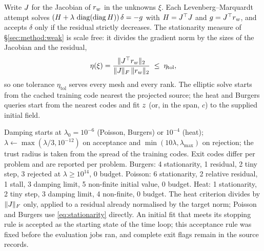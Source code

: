 Write $J_{}$ for the Jacobian of $r_{w}$ in the unknowns $\xi$. Each
Levenberg--Marquardt attempt solves
$(H+\lambda\,\operatorname{diag}(\operatorname{diag} H))\,\delta=-g$ with $H=J_{}^{\top}J_{}$ and
$g=J_{}^{\top}r_{w}$, and accepts $\delta$ only if the residual strictly
decreases. The stationarity measure of \S\ref{sec:method:weak} is scale free: it
divides the gradient norm by the sizes of the Jacobian and the residual,
\begin{equation}
  \eta(\xi)=\frac{\lVert J_{}^{\top}r_{w} \rVert_2}{\lVert J_{} \rVert_{F}\,\lVert r_{w} \rVert_2}
  \;\le\;\eta_{\mathrm{tol}} ,
  \label{eq:stationarity}
\end{equation}
so one tolerance $\eta_{\mathrm{tol}}$ serves every mesh and every rank.
The elliptic solve starts from the cached training code nearest the
projected source; the heat and Burgers queries start from the nearest
codes and fit $z$ (or, in the span, $c$) to the supplied initial
field.

Damping starts at $\lambda_0=10^{-6}$ (Poisson, Burgers) or $10^{-4}$ (heat);
$\lambda\leftarrow\max(\lambda/3,10^{-12})$ on acceptance and
$\min(10\lambda,\lambda_{\max})$ on rejection; the trust radius is taken from the
spread of the training codes. Exit codes differ per problem and are reported per
problem. Burgers: 4 stationarity, 1 residual, 2 tiny step, 3 rejected at
$\lambda\ge10^{14}$, 0 budget. Poisson: 6 stationarity, 2 relative residual, 1
stall, 3 damping limit, 5 non-finite initial value, 0 budget. Heat: 1
stationarity, 2 tiny step, 3 damping limit, 4 non-finite, 0 budget. The heat
criterion divides by $\lVert J_{} \rVert_{F}$ only, applied to a residual already
normalised by the target norm; Poisson and Burgers use \eqref{eq:stationarity}
directly. An initial fit that meets its stopping rule is accepted as the
starting state of the time loop; this acceptance rule was fixed before the
evaluation jobs ran, and complete exit flags remain in the source records.

